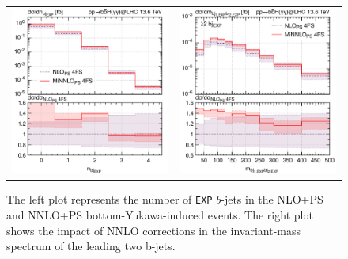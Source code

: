 \documentclass[11pt,a4paper]{article}
\begin{document}
\begin{figure}[t!]
\begin{center}
\begin{tabular}{cc}
\includegraphics[width=.45\textwidth, page=1]{plots/4fs/n_b_jets-EXP.pdf}&
\includegraphics[width=.45\textwidth, page=1]{plots/4fs/m_bb-EXP-2bjet.pdf}
\end{tabular}
\vspace*{1ex}
\caption{The left plot represents the number of \texttt{EXP} $b$-jets in the NLO+PS and NNLO+PS bottom-Yukawa-induced events. The right plot shows the impact of NNLO corrections in the invariant-mass spectrum of the leading two b-jets.\label{fig:4fsMBB}}
\end{center}
\end{figure}
\end{document}
